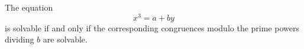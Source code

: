 \begin{proposition}
    The equation
\[
    x^3=a+by
\]
    is solvable if and only if the corresponding congruences modulo the prime powers dividing $b$ are solvable.
\end{proposition}
